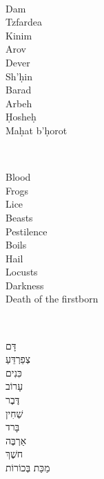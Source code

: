 \documentclass[a4paper,10pt,openany]{memoir}
\newenvironment{HgEnglish}{\strut\\\noindent}{\vspace{1em}}
\newenvironment{HgTranslit}{\strut\\\noindent\begin{itshape}}{\end{itshape}\vspace{1em}}
\newenvironment{HgHebrew}{\begin{otherlanguage}{hebrew}\strut\\\noindent\Large
}{\par\end{otherlanguage}\vspace{1em}}
\begin{document}
\noindent
\begin{minipage}{.33\textwidth}
  \vspace{-1.2em}
  \begin{HgTranslit}
    \begin{Spacing}{1.2}
    Dam \\
    Tzfardea \\
    Kinim \\
    Arov \\
    Dever \\
    Sh'\d{h}in \\
    Barad \\
    Arbeh \\
    \d{H}oshe\d{h} \\
    Ma\d{h}at b'\d{h}orot
    \end{Spacing}
  \end{HgTranslit}
\end{minipage}
\begin{minipage}{.33\textwidth}
  \vspace{-1.2em}
  \begin{HgEnglish}
    \begin{Spacing}{1.2}
      Blood \\
      Frogs \\
      Lice \\
      Beasts \\
      Pestilence \\
      Boils \\
      Hail \\
      Locusts \\
      Darkness \\
      Death of the firstborn
    \end{Spacing}
  \end{HgEnglish}
\end{minipage}
\begin{minipage}{.32\textwidth}
  \begin{HgHebrew}
  דָּם 
  \\
  צְפֵרְדֵּעַ 
  \\
  כִּנִים 
  \\
  עָרוֹב 
  \\
  דֶּבֶר 
  \\
  שְׁחִין 
  \\
  בָּרד
  \\
  אַרְבֶּה 
  \\
  חשֶׁךְ 
  \\
  מַכַּת בְּכוֹרוֹת 
  \end{HgHebrew}
\end{minipage}
\end{document}
